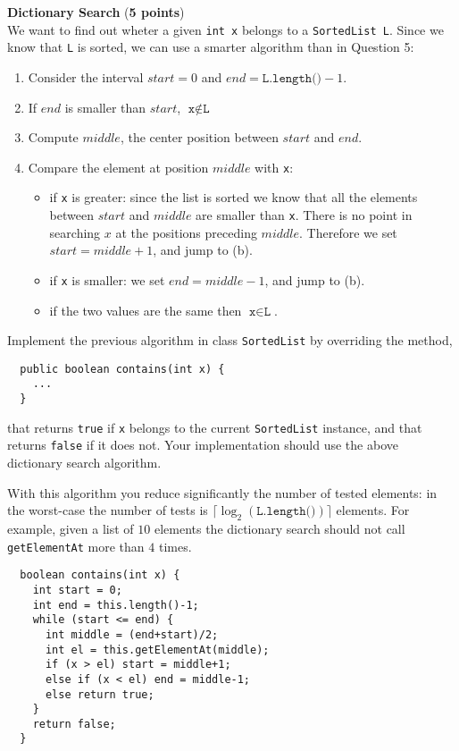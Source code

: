 \documentclass[]{exercices}
\begin{document}
\begin{question} \textbf{Dictionary Search} (\textbf{5 points})\\
We want to find out wheter a given \verb!int x! belongs to
a \verb!SortedList L!.
Since we know that \verb!L! is sorted, we can use a smarter algorithm
than in Question 5:
\begin{enumerate}
  \item Consider the interval $start = 0$ and $end = \texttt{L.length()}-1$.
  \item If $end$  is smaller than $start$, $\texttt{x} \notin \texttt{L}$
  \item Compute $middle$, the center position between $start$ and $end$.
  \item Compare the element at position $middle$ with \verb!x!:
    \begin{itemize}
      \item if \verb!x! is greater: since the list is sorted we know
        that all the elements between $start$ and $middle$ are smaller than
        \verb!x!. There is no point in searching $x$ at the positions
        preceding $middle$. Therefore we set $start = middle+1$, and jump to (b).
      \item if \verb!x! is smaller: we set $end = middle-1$, and
        jump to (b).
      \item if the two values are the same then $\texttt{x} \in \texttt{L}$.
    \end{itemize}
\end{enumerate}

Implement the previous algorithm in class \verb!SortedList! by overriding the method,
\begin{verbatim}
  public boolean contains(int x) {
    ...
  }
\end{verbatim}
that returns \verb!true! if \verb!x! belongs to the current \verb!SortedList!
instance, and that returns \verb!false! if it does not. Your implementation
should use the above dictionary search algorithm.

With this algorithm you reduce significantly the number of tested elements:
in the worst-case the number of tests is $\lceil \log_2(\texttt{L.length()}) \rceil$
elements. For example, given a list of $10$ elements
the dictionary search should not call \verb!getElementAt! more than $4$ times.

\begin{correction}
\begin{verbatim}
  boolean contains(int x) {
    int start = 0;
    int end = this.length()-1;
    while (start <= end) {
      int middle = (end+start)/2;
      int el = this.getElementAt(middle);
      if (x > el) start = middle+1;
      else if (x < el) end = middle-1;
      else return true;
    }
    return false;
  }
\end{verbatim}
\end{correction}
\end{question}
\end{document}
